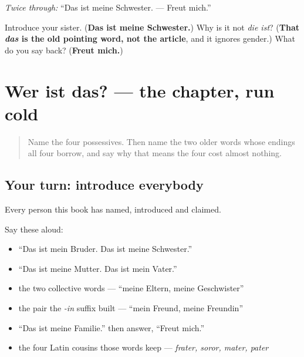 \emph{Twice through:} \textquotedblleft{}Das ist meine Schwester. — Freut mich.\textquotedblright{}

\begin{tcolorbox}[breakable,colback=teal!4,colframe=teal!35!black,title={Before you move on}]
Introduce your sister. (\textbf{Das ist meine Schwester.}) Why is it not \emph{die ist}? (\textbf{That \emph{das} is the old pointing word, not the article}, and it ignores gender.) What do you say back? (\textbf{Freut mich.})
\end{tcolorbox}
\section[Practice]{Wer ist das? — the chapter, run cold}

\label{lesson:GE-R36-wer-ist-das}



\begin{quote}
Name the four possessives. Then name the two older words whose endings all four borrow, and say why that means the four cost almost nothing.
\end{quote}

\subsection*{Your turn: introduce everybody}
Every person this book has named, introduced and claimed.

Say these aloud:

\begin{itemize}
\raggedright
  \item \textquotedblleft{}Das ist mein Bruder. Das ist meine Schwester.\textquotedblright{}
  \item \textquotedblleft{}Das ist meine Mutter. Das ist mein Vater.\textquotedblright{}
  \item the two collective words — \textquotedblleft{}meine Eltern, meine Geschwister\textquotedblright{}
  \item the pair the \emph{-in} suffix built — \textquotedblleft{}mein Freund, meine Freundin\textquotedblright{}
  \item \textquotedblleft{}Das ist meine Familie.\textquotedblright{} then answer, \textquotedblleft{}Freut mich.\textquotedblright{}
  \item the four Latin cousins those words keep — \emph{frater, soror, mater, pater}
\end{itemize}

